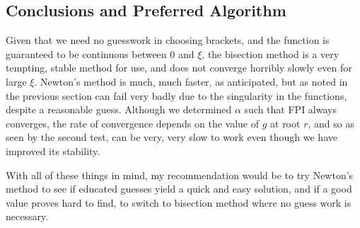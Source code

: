 \documentclass[11pt]{article} %
\begin{document}
\subsection*{Conclusions and Preferred Algorithm}
 Given that we need no guesswork in choosing brackets, and the function is guaranteed to be continuous between $0$ and $\xi$, the bisection method is a very tempting, stable method for use, and does not converge horribly slowly even for large $\xi$. Newton's method is much, much faster, as anticipated, but as noted in the previous section can fail very badly due to the singularity in the functions, despite a reasonable guess. Although we determined $\alpha$ such that FPI always converges, the rate of convergence depends on the value of $g$ at root $r$, and so as seen by the second test, can be very, very slow to work even though we have improved its stability.
\par With all of these things in mind, my recommendation would be to try Newton's method to see if educated guesses yield a quick and easy solution, and if a good value proves hard to find, to switch to bisection method where no guess work is necessary. 
\end{document}
